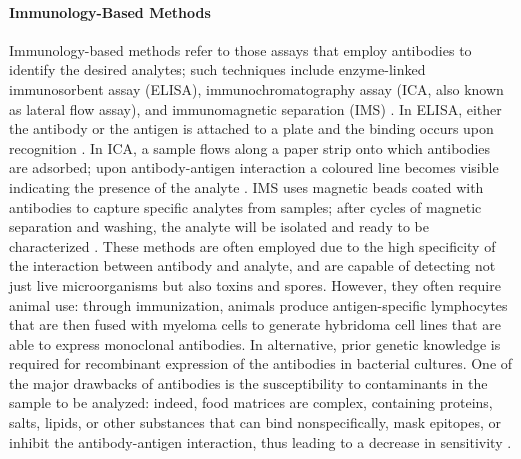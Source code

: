 \paragraph{Immunology-Based Methods}
Immunology-based methods refer to those assays that employ antibodies to
identify the desired analytes; such techniques include enzyme-linked
immunosorbent assay (ELISA), immunochromatography assay (ICA, also known as
lateral flow assay), and immunomagnetic separation (IMS)
\citep{gaoResearch2024}. In ELISA, either the antibody or the antigen is
attached to a plate and the binding occurs upon recognition
\citep{engvallEnzymelinked1971}. In ICA, a sample flows along a paper strip onto
which antibodies are adsorbed; upon antibody-antigen interaction a coloured line
becomes visible indicating the presence of the analyte
\citep{zengImmunochromatographic2021}. IMS uses magnetic beads coated with
antibodies to capture specific analytes from samples; after cycles of magnetic
separation and washing, the analyte will be isolated and ready to be
characterized \citep{moyanoMagnetic2019, gagicFully2020}. These methods are
often employed due to the high specificity of the interaction between antibody
and analyte, and are capable of detecting not just live microorganisms but also
toxins and spores. However, they often require animal use: through immunization,
animals produce antigen-specific lymphocytes that are then fused with myeloma
cells to generate hybridoma cell lines that are able to express monoclonal
antibodies. In alternative, prior genetic knowledge is required for recombinant
expression of the antibodies in bacterial cultures. One of the major drawbacks
of antibodies is the susceptibility to contaminants in the sample to be
analyzed: indeed, food matrices are complex, containing proteins, salts, lipids,
or other substances that can bind nonspecifically, mask epitopes, or inhibit the
antibody-antigen interaction, thus leading to a decrease in sensitivity
\citep{velusamyOverview2010}.

